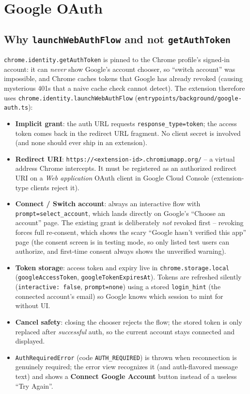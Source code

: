\documentclass[11pt]{article}
\begin{document}
\section{Google OAuth}

\subsection{Why \texttt{launchWebAuthFlow} and not \texttt{getAuthToken}}

\texttt{chrome.identity.getAuthToken} is pinned to the Chrome profile's
signed-in account: it can \emph{never} show Google's account chooser, so
``switch account'' was impossible, and Chrome caches tokens that Google has
already revoked (causing mysterious 401s that a naive cache check cannot
detect). The extension therefore uses
\texttt{chrome.identity.launchWebAuthFlow}
(\texttt{entrypoints/background/google-auth.ts}):

\begin{itemize}
  \item \textbf{Implicit grant}: the auth URL requests
        \texttt{response\_type=token}; the access token comes back in the
        redirect URL fragment. No client secret is involved (and none should
        ever ship in an extension).
  \item \textbf{Redirect URI}: \texttt{https://<extension-id>.chromiumapp.org/}
        -- a virtual address Chrome intercepts. It must be registered as an
        authorized redirect URI on a \emph{Web application} OAuth client in
        Google Cloud Console (extension-type clients reject it).
  \item \textbf{Connect / Switch account}: always an interactive flow with
        \texttt{prompt=select\_account}, which lands directly on Google's
        ``Choose an account'' page. The existing grant is deliberately
        \emph{not} revoked first -- revoking forces full re-consent, which
        shows the scary ``Google hasn't verified this app'' page (the consent
        screen is in testing mode, so only listed test users can authorize,
        and first-time consent always shows the unverified warning).
  \item \textbf{Token storage}: access token and expiry live in
        \texttt{chrome.storage.local} (\texttt{googleAccessToken},
        \texttt{googleTokenExpiresAt}). Tokens are refreshed silently
        (\texttt{interactive: false}, \texttt{prompt=none}) using a stored
        \texttt{login\_hint} (the connected account's email) so Google knows
        which session to mint for without UI.
  \item \textbf{Cancel safety}: closing the chooser rejects the flow; the
        stored token is only replaced after \emph{successful} auth, so the
        current account stays connected and displayed.
  \item \texttt{AuthRequiredError} (code \texttt{AUTH\_REQUIRED}) is thrown
        when reconnection is genuinely required; the error view recognizes it
        (and auth-flavored message text) and shows a \textbf{Connect Google
        Account} button instead of a useless ``Try Again''.
\end{itemize}
\end{document}
